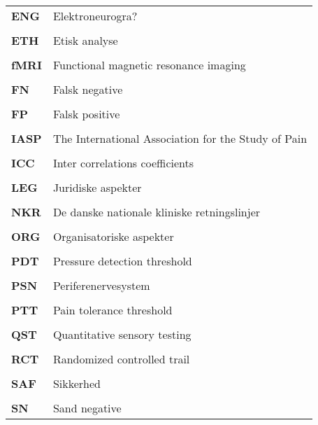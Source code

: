 \begin{longtable}{p{}  p{}}
\textbf{ENG} & Elektroneurogra?                                         
\\ \\
\textbf{ETH} & Etisk analyse                                            
\\ \\
\textbf{fMRI}& Functional magnetic resonance imaging                    
\\ \\
\textbf{FN}  & Falsk negative                                           
\\ \\
\textbf{FP}  & Falsk positive                                           
\\ \\
\textbf{IASP}& The International Association for the Study of Pain      
\\ \\
\textbf{ICC} & Inter correlations coefficients                          
\\ \\
\textbf{LEG} & Juridiske aspekter                                       
\\ \\
\textbf{NKR} & De danske nationale kliniske retningslinjer              
\\ \\
\textbf{ORG} & Organisatoriske aspekter                                 
\\ \\
\textbf{PDT} & Pressure detection threshold                             
\\ \\
\textbf{PSN} & Periferenervesystem                                      
\\ \\
\textbf{PTT} & Pain tolerance threshold                                 
\\ \\
\textbf{QST} & Quantitative sensory testing                             
\\ \\
\textbf{RCT} & Randomized controlled trail                                             
\\ \\
\textbf{SAF} & Sikkerhed                                                
\\ \\
\textbf{SN}  & Sand negative                                            

\end{longtable}
